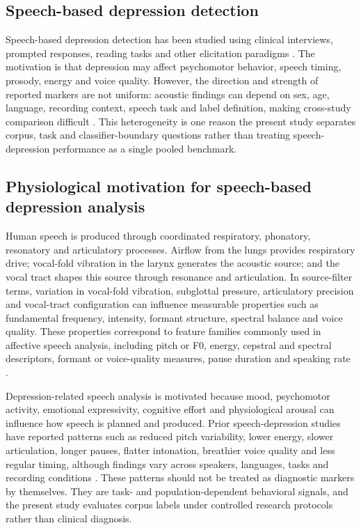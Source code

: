 \documentclass[lettersize,journal]{IEEEtran}
\begin{document}
\subsection{Speech-based depression detection}

Speech-based depression detection has been studied using clinical interviews, prompted responses, reading tasks and other elicitation paradigms \cite{leal2025survey}. The motivation is that depression may affect psychomotor behavior, speech timing, prosody, energy and voice quality. However, the direction and strength of reported markers are not uniform: acoustic findings can depend on sex, age, language, recording context, speech task and label definition, making cross-study comparison difficult \cite{leal2025survey}. This heterogeneity is one reason the present study separates corpus, task and classifier-boundary questions rather than treating speech-depression performance as a single pooled benchmark.

\subsection{Physiological motivation for speech-based depression analysis}

Human speech is produced through coordinated respiratory, phonatory, resonatory and articulatory processes. Airflow from the lungs provides respiratory drive; vocal-fold vibration in the larynx generates the acoustic source; and the vocal tract shapes this source through resonance and articulation. In source-filter terms, variation in vocal-fold vibration, subglottal pressure, articulatory precision and vocal-tract configuration can influence measurable properties such as fundamental frequency, intensity, formant structure, spectral balance and voice quality. These properties correspond to feature families commonly used in affective speech analysis, including pitch or F0, energy, cepstral and spectral descriptors, formant or voice-quality measures, pause duration and speaking rate \cite{leal2025survey,valstar2016avec,tao2023featureCorrelation}.

Depression-related speech analysis is motivated because mood, psychomotor activity, emotional expressivity, cognitive effort and physiological arousal can influence how speech is planned and produced. Prior speech-depression studies have reported patterns such as reduced pitch variability, lower energy, slower articulation, longer pauses, flatter intonation, breathier voice quality and less regular timing, although findings vary across speakers, languages, tasks and recording conditions \cite{leal2025survey,tao2023featureCorrelation}. These patterns should not be treated as diagnostic markers by themselves. They are task- and population-dependent behavioral signals, and the present study evaluates corpus labels under controlled research protocols rather than clinical diagnosis.
\end{document}

